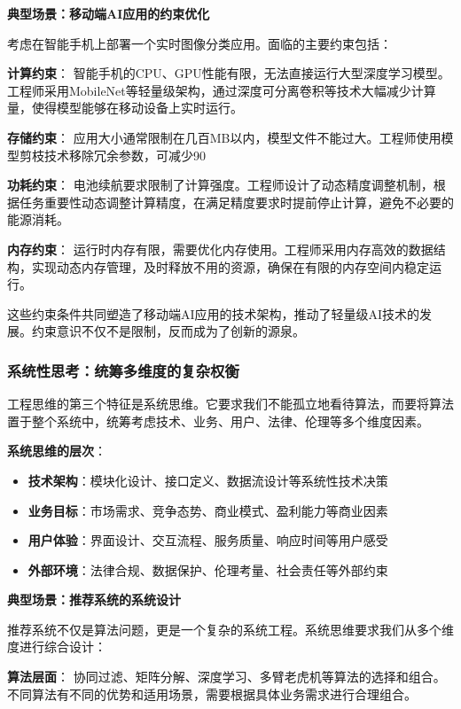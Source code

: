 \textbf{典型场景：移动端AI应用的约束优化}

考虑在智能手机上部署一个实时图像分类应用。面临的主要约束包括：

\textbf{计算约束}：
智能手机的CPU、GPU性能有限，无法直接运行大型深度学习模型。工程师采用MobileNet等轻量级架构，通过深度可分离卷积等技术大幅减少计算量，使得模型能够在移动设备上实时运行。

\textbf{存储约束}：
应用大小通常限制在几百MB以内，模型文件不能过大。工程师使用模型剪枝技术移除冗余参数，可减少90%

\textbf{功耗约束}：
电池续航要求限制了计算强度。工程师设计了动态精度调整机制，根据任务重要性动态调整计算精度，在满足精度要求时提前停止计算，避免不必要的能源消耗。

\textbf{内存约束}：
运行时内存有限，需要优化内存使用。工程师采用内存高效的数据结构，实现动态内存管理，及时释放不用的资源，确保在有限的内存空间内稳定运行。

这些约束条件共同塑造了移动端AI应用的技术架构，推动了轻量级AI技术的发展。约束意识不仅不是限制，反而成为了创新的源泉。

\subsubsection{系统性思考：统筹多维度的复杂权衡}

工程思维的第三个特征是系统思维。它要求我们不能孤立地看待算法，而要将算法置于整个系统中，统筹考虑技术、业务、用户、法律、伦理等多个维度因素。

\textbf{系统思维的层次}：
\begin{itemize}
\item \textbf{技术架构}：模块化设计、接口定义、数据流设计等系统性技术决策
\item \textbf{业务目标}：市场需求、竞争态势、商业模式、盈利能力等商业因素
\item \textbf{用户体验}：界面设计、交互流程、服务质量、响应时间等用户感受
\item \textbf{外部环境}：法律合规、数据保护、伦理考量、社会责任等外部约束
\end{itemize}

\textbf{典型场景：推荐系统的系统设计}

推荐系统不仅是算法问题，更是一个复杂的系统工程。系统思维要求我们从多个维度进行综合设计：

\textbf{算法层面}：
协同过滤、矩阵分解、深度学习、多臂老虎机等算法的选择和组合。不同算法有不同的优势和适用场景，需要根据具体业务需求进行合理组合。

